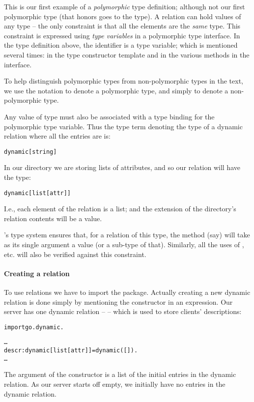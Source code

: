 This is our first example of a \emph{polymorphic} type definition; although not our first polymorphic type (that honors goes to the  type). A  relation can hold values of any type -- the only constraint is that all the elements are the \emph{same} type. This constraint is expressed using \emph{type variables} in a polymorphic type interface. In the  type definition above, the identifier  is a type variable; which is mentioned several times: in the type constructor template and in the various methods in the interface.

\begin{aside}
To help distinguish polymorphic types from non-polymorphic types in the text, we use the notation  to denote a polymorphic type, and simply  to denote a non-polymorphic type.
\end{aside}

Any value of type  must also be associated with a type binding for the polymorphic type variable. Thus the type term denoting the type of a dynamic relation where all the entries are  is:
\begin{alltt}
dynamic[string]
\end{alltt}
In our directory we are storing lists of attributes, and so our  relation will have the type:
\begin{alltt}
dynamic[list[attr]]
\end{alltt}
I.e., each element of the  relation is a list; and the extension of the directory's  relation contents will be a  value.

\go's type system ensures that, for a  relation of this type, the  method (say) will take as its single argument a  value (or a sub-type of that). Similarly, all the uses of ,  etc. will also be verified against this constraint.

\paragraph{Creating a  relation}
To use  relations we have to import the  package. Actually creating a new dynamic relation is done simply by mentioning the  constructor in an expression. Our server has one dynamic relation --  -- which is used to store clients' descriptions:
\begin{alltt}
import go.dynamic.

\ldots
    descr:dynamic[list[attr]] = dynamic([]).
\ldots
\end{alltt}
The argument of the  constructor is a list of the initial entries in the dynamic relation. As our server starts off empty, we initially have no entries in the  dynamic relation.



